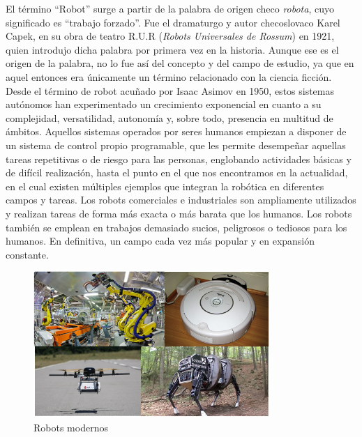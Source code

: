 El término “Robot” surge a partir de la palabra de origen checo \textit{robota}, cuyo significado es “trabajo forzado”. Fue el dramaturgo y autor checoslovaco Karel Capek, en su obra de teatro R.U.R (\textit{Robots Universales de Rossum}) en 1921, quien introdujo dicha palabra por primera vez en la historia. Aunque ese es el origen de la palabra, no lo fue así del concepto y del campo de estudio, ya que en aquel entonces era únicamente un término relacionado con la ciencia ficción. Desde el término de robot acuñado por Isaac Asimov en 1950, estos sistemas autónomos han experimentado un crecimiento exponencial en cuanto a su complejidad, versatilidad, autonomía y, sobre todo, presencia en multitud de ámbitos. Aquellos sistemas operados por seres humanos empiezan a disponer de un sistema de control propio programable, que les permite desempeñar aquellas tareas repetitivas o de riesgo para las personas, englobando actividades básicas y de difícil realización, hasta el punto en el que nos encontramos en la actualidad, en el cual existen múltiples ejemplos que integran la robótica en diferentes campos y tareas. Los robots comerciales e industriales son ampliamente utilizados y realizan tareas de forma más exacta o más barata que los humanos. Los robots también se emplean en trabajos demasiado sucios, peligrosos o tediosos para los humanos. En definitiva, un campo cada vez más popular y en expansión constante.

\begin{figure}[H]
  \begin{center}
    \includegraphics[width=0.8\textwidth]{figures/robots.png}
		\caption{Robots modernos}
		\label{fig.robots}
		\end{center}
\end{figure}

